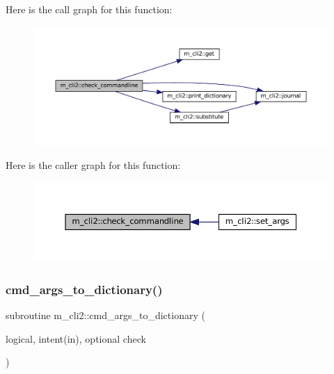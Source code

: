 Here is the call graph for this function\+:\nopagebreak
\begin{figure}[H]
\begin{center}
\leavevmode
\includegraphics[width=350pt]{namespacem__cli2_a02d4639b325d1b8c6fd3b03ba515f2b3_cgraph}
\end{center}
\end{figure}
Here is the caller graph for this function\+:\nopagebreak
\begin{figure}[H]
\begin{center}
\leavevmode
\includegraphics[width=350pt]{namespacem__cli2_a02d4639b325d1b8c6fd3b03ba515f2b3_icgraph}
\end{center}
\end{figure}
\mbox{\label{namespacem__cli2_a3348b0c76dadd62c536e06f82bcb0331}} 
\subsubsection{\texorpdfstring{cmd\+\_\+args\+\_\+to\+\_\+dictionary()}{cmd\_args\_to\_dictionary()}}
{\footnotesize\ttfamily subroutine m\+\_\+cli2\+::cmd\+\_\+args\+\_\+to\+\_\+dictionary (\begin{DoxyParamCaption}\item[{logical, intent(in), optional}]{check }\end{DoxyParamCaption})\hspace{0.3cm}{\ttfamily [private]}}



